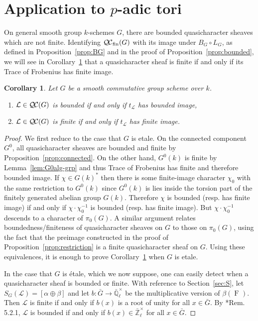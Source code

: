 \documentclass{amsart}
\theoremstyle{plain}
\newtheorem{corollary}[theorem]{Corollary}
\theoremstyle{definition}
\theoremstyle{remark}
\newcommand{\EE}{\mathbb{\bar Q}_\ell}
\newcommand{\Fq}{k}
\newcommand{\EEx}{\EE^\times}
\newcommand{\Zlx}{\mathbb{\bar Z}_\ell^\times}
\newcommand{\Frob}[1]{\operatorname{F}_{#1}}
\newcommand{\qcs}[1]{{\mathcal{#1}}}
\newcommand{\QC}{{\mathcal{Q\hskip-0.8pt C}}}
\newcommand{\fQC}{{\QC_\text{fin}}}
\newcommand{\trFrob}[1]{t_{#1}}
\begin{document}
\section{Application to \texorpdfstring{$p$}{p}-adic tori}

On general smooth group $\Fq$-schemes $G$, 
there are bounded quasicharacter sheaves which are not finite.  
Identifying $\fQC(G)$ with its image under $B_G \circ L_G$, as defined in
Proposition~\ref{prop:BG} and in the proof of Proposition~\ref{prop:bounded},
we will see in Corollary~\ref{cor:bounded-and-finite} that
a quasicharacter sheaf is finite if and only if its Trace of Frobenius has finite image.

\begin{corollary} \label{cor:bounded-and-finite}
Let $G$ be a smooth commutative group scheme over $\Fq$.
\begin{enumerate}
\item $\qcs{L} \in \QC(G)$ is bounded if and only if $\trFrob{\qcs{L}}$ has bounded image,
\item $\qcs{L}\in \QC(G)$ is finite if and only if $\trFrob{\qcs{L}}$ has finite image.
\end{enumerate}
\end{corollary}

\begin{proof}
We first reduce to the case that $G$ is etale.
On the connected component
$G^0$, all quasicharacter sheaves are bounded and finite by Proposition~\ref{prop:connected}.
On the other hand, $G^0(\Fq)$ is finite by Lemma~\ref{lem:G0alg-grp} and thus Trace of Frobenius
has finite and therefore bounded image.  If $\chi \in G(\Fq)^*$ then there is some finite-image character $\chi_0$
with the same restriction to $G^0(\Fq)$ since $G^0(\Fq)$ is lies inside the torsion part of
the finitely generated abelian group $G(\Fq)$.  Therefore $\chi$ is bounded (resp. has finite image)
if and only if $\chi \cdot \chi_0^{-1}$ is bounded (resp. has finite image).  But $\chi \cdot \chi_0^{-1}$ descends
to a character of $\pi_0(G)$.  A similar argument relates boundedness/finiteness of quasicharacter
sheaves on $G$ to those on $\pi_0(G)$, using the fact that the preimage constructed in the proof of
Proposition~\ref{prop:restriction} is a finite quasicharacter sheaf on $G$.
Using these equivalences, it is enough to prove Corollary~\ref{cor:bounded-and-finite} when $G$ is etale.

In the case that $G$ is \'etale, which we now suppose,
one can easily detect when a quasicharacter sheaf is bounded or finite.
With reference to Section~\ref{sec:S},
let $S_G(\qcs{L}) = [\alpha \oplus \beta]$
and let $b : {\bar G}\to \EEx$ be the multiplicative version of $\beta(\Frob{})$.
Then $\qcs{L}$ is finite if and only if
$b(x)$ is a root of unity for all $x\in {\bar G}$.
By \cite{beilinson-bernstein-deligne:81a}*{Rem. 5.2.1},
$\qcs{L}$ is bounded if and only if $b(x) \in \Zlx$ for all $x\in {\bar G}$.
\end{proof}
\end{document}
